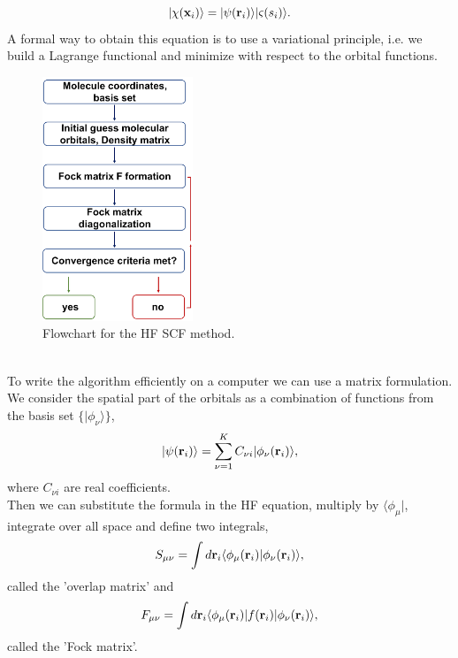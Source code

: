 \begin{equation}
    |\chi({\bf x}_i)\rangle = |\psi({\bf r}_i)\rangle |\varsigma(s_i)\rangle.
\end{equation}
A formal way to obtain this equation is to use a variational principle, i.e. we build a Lagrange functional and minimize with respect to the orbital functions.
\begin{figure}[ht]
\centering
\includegraphics[width=0.4\textwidth]{figures/Flowchart for the HF SCF method.png} 
\caption{Flowchart for the HF SCF method.} \label{HF SCF method}
\end{figure} \\
To write the algorithm efficiently on a computer we can use a matrix formulation. We consider the spatial part of the orbitals as a combination of functions from the basis set $\{ |\phi_{\nu}\rangle \}$,
\begin{equation}
    |\psi({\bf r}_i)\rangle = \sum_{\nu = 1}^K C_{\nu i} |\phi_{\nu}({\bf r}_i)\rangle,
\end{equation}
where $C_{\nu i}$ are real coefficients. \\
Then we can substitute the formula in the HF equation, multiply by $\langle \phi_{\mu}|$, integrate over all space and define two integrals,
\begin{equation}
    S_{\mu \nu} = \int d{\bf r}_i \langle \phi_{\mu}({\bf r}_i)|\phi_{\nu}({\bf r}_i)\rangle,
\end{equation}
called the 'overlap matrix' and
\begin{equation}
    F_{\mu \nu} = \int d{\bf r}_i \langle \phi_{\mu}({\bf r}_i)| f({\bf r}_i) |\phi_{\nu}({\bf r}_i)\rangle,
\end{equation}
called the 'Fock matrix'. \\
